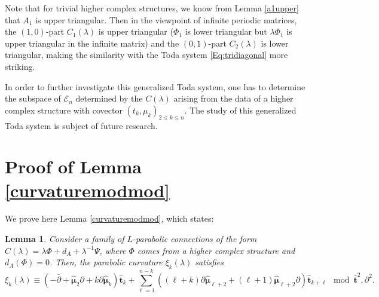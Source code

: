 \documentclass[11pt]{amsart}
\newtheorem*{fakelemma}{Lemma}
\numberwithin{thm}{section} %
\numberwithin{equation}{section} %
\numberwithin{figure}{section} %
\renewcommand*{\l}{\lambda}
\newcommand*{\del}{\partial}
\begin{document}
Note that for trivial higher complex structures, we know from Lemma \ref{a1upper} that $A_1$ is upper triangular. Then in the viewpoint of infinite periodic matrices, the $(1,0)$-part $C_1(\l)$ is upper triangular ($\Phi_1$ is lower triangular but $\l\Phi_1$ is upper triangular in the infinite matrix) and the $(0,1)$-part $C_2(\l)$ is lower triangular, making the similarity with the Toda system \eqref{Eq:tridiagonal} more striking.

In order to further investigate this generalized Toda system, one has to determine the subspace of $\mathcal{E}_n$ determined by the $C(\l)$ arising from the data of a higher complex structure with covector $(t_k,\mu_k)_{2\leq k\leq n}$. 
The study of this generalized Toda system is subject of future research.


\appendix

\section{Proof of Lemma \ref{curvaturemodmod}}\label{appendix:C}

We prove here Lemma \ref{curvaturemodmod}, which states:
\begin{fakelemma}
Consider a family of $L$-parabolic connections of the form $C(\l)=\l\Phi+d_A+\l^{-1}\Psi$, where $\Phi$ comes from a higher complex structure and $d_A(\Phi)=0$. Then, the parabolic curvature $\xi_k(\l)$ satisfies
$$\xi_k(\l) \equiv (-\bar{\partial}\!+\!\bm\hat{\mu}_2\partial\!+\!k\partial\bm\hat{\mu}_k)\bm\hat{t}_k+\sum_{\ell=1}^{n-k}\left((\ell\!+\!k)\partial\bm\hat{\mu}_{\ell+2}+(\ell\!+\!1)\bm\hat{\mu}_{\ell+2}\del\right)\bm\hat{t}_{k+\ell} \mod \bm\hat{t}^2,\partial^2.$$
\end{fakelemma}
\end{document}

